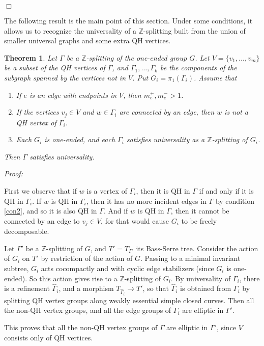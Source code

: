 \documentclass[12pt]{amsart}
\newtheorem{theorem}{Theorem}[section]
\newcommand{\Z}{\mathbb{Z}}
\begin{document}
$\Box$

The following result is the main point of this section. Under some conditions, it allows us to recognize the universality of a $\Z$-splitting built from the union of smaller universal graphs and some extra QH vertices.

\begin{theorem} \label{univ-new} Let $\Gamma$ be a $\Z$-splitting of the one-ended group $G$. Let $V=\{v_1,\ldots,v_m \}$ be a subset of the QH vertices of $\Gamma$, and $\Gamma_1,\ldots,\Gamma_k$ be the components of the subgraph spanned by the vertices not in $V$. Put $G_i=\pi_1(\Gamma_i)$. Assume that
\begin{enumerate}
\item \label{con1} If $e$ is an edge with endpoints in $V$, then $m_e^+,m_e^->1$.
\item \label{con2} If the vertices $v_j\in V$ and $w\in\Gamma_i$ are connected by an edge, then $w$ is not a QH vertex of $\Gamma_i$.
\item \label{con3} Each $G_i$ is one-ended, and each $\Gamma_i$ satisfies universality as a $\Z$-splitting of $G_i$.
\end{enumerate}
Then $\Gamma$ satisfies universality.
\end{theorem}

{\em Proof:}

First we observe that if $w$ is a vertex of $\Gamma_i$, then it is QH in $\Gamma$ if and only if it is QH in $\Gamma_i$. If $w$ is QH in $\Gamma_i$, then it has no more incident edges in $\Gamma$ by condition \ref{con2}, and so it is also QH in $\Gamma$. And if $w$ is QH in $\Gamma$, then it cannot be connected by an edge to $v_j\in V$, for that would cause $G_i$ to be freely decomposable.

Let $\Gamma'$ be a $\Z$-splitting of $G$, and $T' = T_{\Gamma'}$ its Bass-Serre tree. Consider the action of $G_i$ on $T'$ by restriction of the action of $G$. Passing to a minimal invariant subtree, $G_i$ acts cocompactly and with cyclic edge stabilizers (since $G_i$ is one-ended). So this action gives rise to a $\Z$-splitting of $G_i$. By universality of $\Gamma_i$, there is a refinement $\hat \Gamma_i$, and a morphism $T_{\hat \Gamma_i} \to T'$, so that $\hat \Gamma_i$ is obtained from $\Gamma_i$ by splitting QH vertex groups along weakly essential simple closed curves. Then all the non-QH vertex groups, and all the edge groups of $\Gamma_i$ are elliptic in $\Gamma'$.

This proves that all the non-QH vertex groups of $\Gamma$ are elliptic in $\Gamma'$, since $V$ consists only of QH vertices. 
\end{document}
